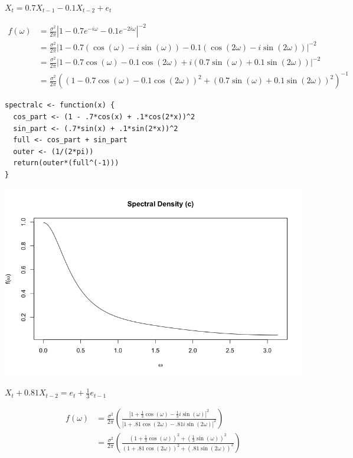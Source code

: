 \documentclass[10pt,a4paper]{exam}
\begin{document}
\begin{questions}
\begin{parts}
\item $X_t = 0.7X_{t-1} - 0.1X_{t-2} + e_t$
\begin{solution}
\begin{align*}
f(\omega)		&= \frac{\sigma^2}{2\pi} \left| 1 - 0.7e^{-i\omega} - 0.1e^{-2i\omega} \right|^{-2}\\
					&= \frac{\sigma^2}{2\pi} \left| 1 - 0.7\left(\cos(\omega) - i\sin(\omega)\right) - 0.1\left(\cos(2\omega) - i\sin(2\omega)\right)\right|^{-2}\\
					&= \frac{\sigma^2}{2\pi} \left| 1 - 0.7\cos(\omega) - 0.1\cos(2\omega) + i\left(0.7\sin(\omega) + 0.1\sin(2\omega)\right) \right|^{-2}\\
					&= \frac{\sigma^2}{2\pi} \left( \left(1 - 0.7\cos(\omega) - 0.1\cos(2\omega) \right)^2 + \left(0.7\sin(\omega) + 0.1\sin(2\omega) \right)^2 \right)^{-1}
\end{align*}
\begin{verbatim}
spectralc <- function(x) {
  cos_part <- (1 - .7*cos(x) + .1*cos(2*x))^2
  sin_part <- (.7*sin(x) + .1*sin(2*x))^2
  full <- cos_part + sin_part
  outer <- (1/(2*pi))
  return(outer*(full^(-1)))
}
\end{verbatim}
\begin{center}
\includegraphics[width = .9\linewidth]{1c}
\end{center}
\end{solution}



\pagebreak
\item $X_t + 0.81X_{t-2} = e_t + \frac{1}{3}e_{t-1}$
\begin{solution}
\begin{align*}
f(\omega) 			&= \frac{\sigma^2}{2\pi}  \left(\frac{\left|1 + \frac{1}{3}\cos(\omega) - \frac{1}{3}i\sin(\omega)\right|^2}{\left|1 + .81\cos(2\omega) - .81i\sin(2\omega)\right|^2}\right)\\
						&= \frac{\sigma^2}{2\pi} \left( \frac{\left(1 + \frac{1}{3}\cos(\omega)\right)^2 + \left(\frac{1}{3}\sin(\omega)\right)^2}{\left(1 + .81\cos(2\omega)\right)^2 + \left(.81\sin(2\omega)\right)^2}				\right)
\end{align*}


\end{solution}
\end{parts}
\end{questions}
\end{document}
